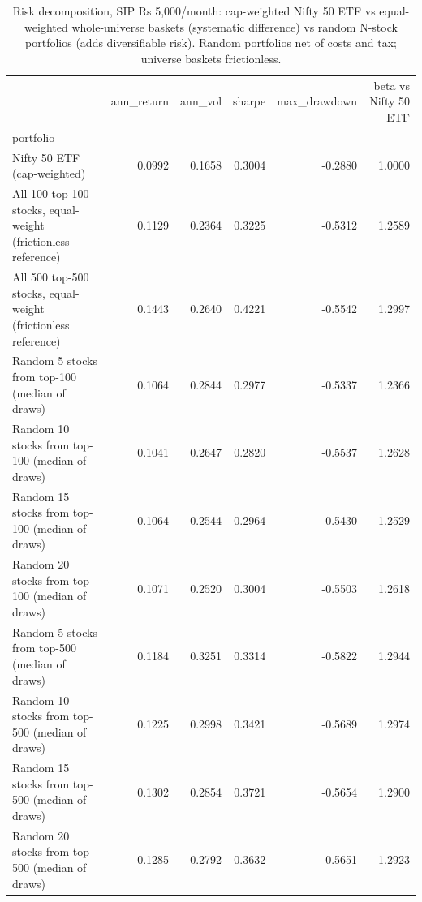 \begin{table}
\caption{Risk decomposition, SIP Rs 5,000/month: cap-weighted Nifty 50 ETF vs equal-weighted whole-universe baskets (systematic difference) vs random N-stock portfolios (adds diversifiable risk). Random portfolios net of costs and tax; universe baskets frictionless.}
\label{tab:T16_risk_decomposition}
\begin{tabular}{lrrrrr}
\toprule
 & ann\_return & ann\_vol & sharpe & max\_drawdown & beta vs Nifty 50 ETF \\
portfolio &  &  &  &  &  \\
\midrule
Nifty 50 ETF (cap-weighted) & 0.0992 & 0.1658 & 0.3004 & -0.2880 & 1.0000 \\
All 100 top-100 stocks, equal-weight (frictionless reference) & 0.1129 & 0.2364 & 0.3225 & -0.5312 & 1.2589 \\
All 500 top-500 stocks, equal-weight (frictionless reference) & 0.1443 & 0.2640 & 0.4221 & -0.5542 & 1.2997 \\
Random 5 stocks from top-100 (median of draws) & 0.1064 & 0.2844 & 0.2977 & -0.5337 & 1.2366 \\
Random 10 stocks from top-100 (median of draws) & 0.1041 & 0.2647 & 0.2820 & -0.5537 & 1.2628 \\
Random 15 stocks from top-100 (median of draws) & 0.1064 & 0.2544 & 0.2964 & -0.5430 & 1.2529 \\
Random 20 stocks from top-100 (median of draws) & 0.1071 & 0.2520 & 0.3004 & -0.5503 & 1.2618 \\
Random 5 stocks from top-500 (median of draws) & 0.1184 & 0.3251 & 0.3314 & -0.5822 & 1.2944 \\
Random 10 stocks from top-500 (median of draws) & 0.1225 & 0.2998 & 0.3421 & -0.5689 & 1.2974 \\
Random 15 stocks from top-500 (median of draws) & 0.1302 & 0.2854 & 0.3721 & -0.5654 & 1.2900 \\
Random 20 stocks from top-500 (median of draws) & 0.1285 & 0.2792 & 0.3632 & -0.5651 & 1.2923 \\
\bottomrule
\end{tabular}
\end{table}
